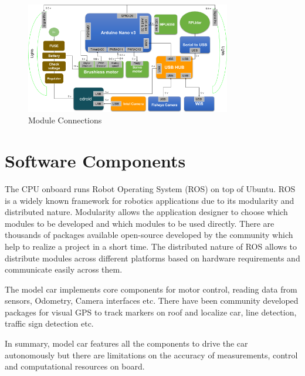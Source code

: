 \begin{figure}
	\centering
	\includegraphics[width=0.8\textwidth]{Images/platform/hardware_Connections.png}
	\caption{Module Connections}
	\label{moduleconnections}
\end{figure}

\section{Software Components}
The CPU onboard runs Robot Operating System (ROS) on top of Ubuntu. ROS is a widely known framework for robotics applications due to its modularity and distributed nature. Modularity allows the application designer to choose which modules to be developed and which modules to be used directly. There are thousands of packages available open-source developed by the community which help to realize a project in a short time. The distributed nature of ROS allows to distribute modules across different platforms based on hardware requirements and communicate easily across them.

The model car implements core components for motor control, reading data from sensors, Odometry, Camera interfaces etc. There have been community developed packages for visual GPS to track markers on roof and localize car, line detection, traffic sign detection etc.

In summary, model car features all the components to drive the car autonomously but there are limitations on the accuracy  of measurements, control and computational resources on board. 


